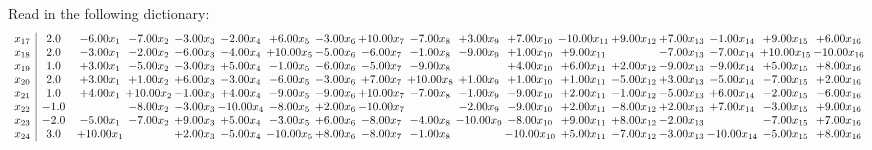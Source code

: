 \documentclass[9pt]{article}
\begin{document}
Read in the following dictionary:
\[\begin{array}{c| c c@{\hskip 2pt} c@{\hskip 2pt} c@{\hskip 2pt} c@{\hskip 2pt} c@{\hskip 2pt} c@{\hskip 2pt} c@{\hskip 2pt} c@{\hskip 2pt} c@{\hskip 2pt} c@{\hskip 2pt} c@{\hskip 2pt} c@{\hskip 2pt} c@{\hskip 2pt} c@{\hskip 2pt} c@{\hskip 2pt} c@{\hskip 2pt} }
 x_{17}   &  2.0 & -6.00 x_{1} & -7.00 x_{2} & -3.00 x_{3} & -2.00 x_{4} & +  6.00 x_{5} & -3.00 x_{6} & + 10.00 x_{7} & -7.00 x_{8} & +  3.00 x_{9} & +  7.00 x_{10} & -10.00 x_{11} & +  9.00 x_{12} & +  7.00 x_{13} & -1.00 x_{14} & +  9.00 x_{15} & +  6.00 x_{16}\\
 x_{18}   &  2.0 & -3.00 x_{1} & -2.00 x_{2} & -6.00 x_{3} & -4.00 x_{4} & + 10.00 x_{5} & -5.00 x_{6} & -6.00 x_{7} & -1.00 x_{8} & -9.00 x_{9} & +  1.00 x_{10} & +  9.00 x_{11} &   & -7.00 x_{13} & -7.00 x_{14} & + 10.00 x_{15} & -10.00 x_{16}\\
 x_{19}   &  1.0 & +  3.00 x_{1} & -5.00 x_{2} & -3.00 x_{3} & +  5.00 x_{4} & -1.00 x_{5} & -6.00 x_{6} & -5.00 x_{7} & -9.00 x_{8} &   & +  4.00 x_{10} & +  6.00 x_{11} & +  2.00 x_{12} & -9.00 x_{13} & -9.00 x_{14} & +  5.00 x_{15} & +  8.00 x_{16}\\
 x_{20}   &  2.0 & +  3.00 x_{1} & +  1.00 x_{2} & +  6.00 x_{3} & -3.00 x_{4} & -6.00 x_{5} & -3.00 x_{6} & +  7.00 x_{7} & + 10.00 x_{8} & +  1.00 x_{9} & +  1.00 x_{10} & +  1.00 x_{11} & -5.00 x_{12} & +  3.00 x_{13} & -5.00 x_{14} & -7.00 x_{15} & +  2.00 x_{16}\\
 x_{21}   &  1.0 & +  4.00 x_{1} & + 10.00 x_{2} & -1.00 x_{3} & +  4.00 x_{4} & -9.00 x_{5} & -9.00 x_{6} & + 10.00 x_{7} & -7.00 x_{8} & -1.00 x_{9} & -9.00 x_{10} & +  2.00 x_{11} & -1.00 x_{12} & -5.00 x_{13} & +  6.00 x_{14} & -2.00 x_{15} & -6.00 x_{16}\\
 x_{22}   &  -1.0  &   & -8.00 x_{2} & -3.00 x_{3} & -10.00 x_{4} & -8.00 x_{5} & +  2.00 x_{6} & -10.00 x_{7} &   & -2.00 x_{9} & -9.00 x_{10} & +  2.00 x_{11} & -8.00 x_{12} & +  2.00 x_{13} & +  7.00 x_{14} & -3.00 x_{15} & +  9.00 x_{16}\\
 x_{23}   &  -2.0 & -5.00 x_{1} & -7.00 x_{2} & +  9.00 x_{3} & +  5.00 x_{4} & -3.00 x_{5} & +  6.00 x_{6} & -8.00 x_{7} & -4.00 x_{8} & -10.00 x_{9} & -8.00 x_{10} & +  9.00 x_{11} & +  8.00 x_{12} & -2.00 x_{13} &   & -7.00 x_{15} & +  7.00 x_{16}\\
 x_{24}   &  3.0 & + 10.00 x_{1} &   & +  2.00 x_{3} & -5.00 x_{4} & -10.00 x_{5} & +  8.00 x_{6} & -8.00 x_{7} & -1.00 x_{8} &   & -10.00 x_{10} & +  5.00 x_{11} & -7.00 x_{12} & -3.00 x_{13} & -10.00 x_{14} & -5.00 x_{15} & +  8.00 x_{16}\\

\end{array}\]
\end{document}
